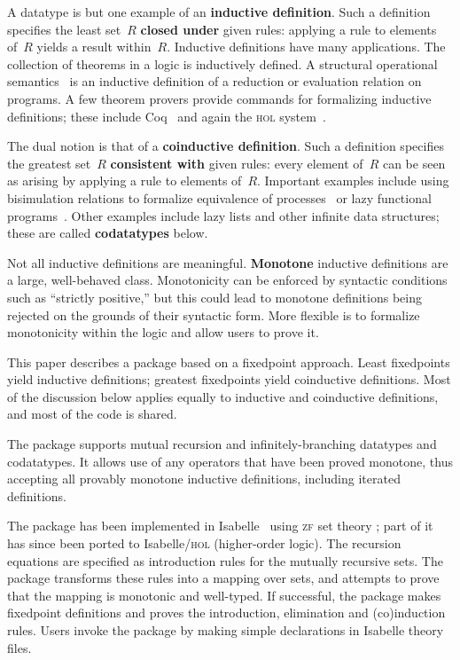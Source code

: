 \documentclass[12pt]{article}
\newcommand\defn[1]{{\bf#1}}
\begin{document}
A datatype is but one example of an \defn{inductive definition}.  Such a
definition~\cite{aczel77} specifies the least set~$R$ \defn{closed under}
given rules: applying a rule to elements of~$R$ yields a result within~$R$.
Inductive definitions have many applications.  The collection of theorems in a
logic is inductively defined.  A structural operational
semantics~\cite{hennessy90} is an inductive definition of a reduction or
evaluation relation on programs.  A few theorem provers provide commands for
formalizing inductive definitions; these include Coq~\cite{paulin-tlca} and
again the \textsc{hol} system~\cite{camilleri92}.

The dual notion is that of a \defn{coinductive definition}.  Such a definition
specifies the greatest set~$R$ \defn{consistent with} given rules: every
element of~$R$ can be seen as arising by applying a rule to elements of~$R$.
Important examples include using bisimulation relations to formalize
equivalence of processes~\cite{milner89} or lazy functional
programs~\cite{abramsky90}.  Other examples include lazy lists and other
infinite data structures; these are called \defn{codatatypes} below.

Not all inductive definitions are meaningful.  \defn{Monotone} inductive
definitions are a large, well-behaved class.  Monotonicity can be enforced
by syntactic conditions such as ``strictly positive,'' but this could lead to
monotone definitions being rejected on the grounds of their syntactic form.
More flexible is to formalize monotonicity within the logic and allow users
to prove it.

This paper describes a package based on a fixedpoint approach.  Least
fixedpoints yield inductive definitions; greatest fixedpoints yield
coinductive definitions.  Most of the discussion below applies equally to
inductive and coinductive definitions, and most of the code is shared.  

The package supports mutual recursion and infinitely-branching datatypes and
codatatypes.  It allows use of any operators that have been proved monotone,
thus accepting all provably monotone inductive definitions, including
iterated definitions.

The package has been implemented in
Isabelle~\cite{paulson-markt,paulson-isa-book} using 
\textsc{zf} set theory \cite{paulson-set-I,paulson-set-II}; part of it has
since been ported to Isabelle/\textsc{hol} (higher-order logic).  The
recursion equations are specified as introduction rules for the mutually
recursive sets.  The package transforms these rules into a mapping over sets,
and attempts to prove that the mapping is monotonic and well-typed.  If
successful, the package makes fixedpoint definitions and proves the
introduction, elimination and (co)induction rules.  Users invoke the package
by making simple declarations in Isabelle theory files.
\end{document}
